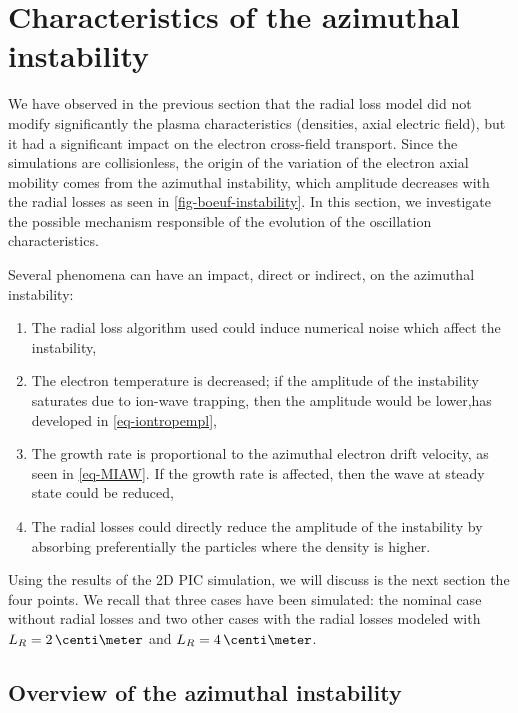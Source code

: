 
\FloatBarrier
\section{Characteristics of the azimuthal instability}
\label{sec-Ztheta-instability}

We have observed in the previous section that the radial loss model did not modify significantly the plasma characteristics (densities, axial electric field), but it had a significant impact on the electron cross-field transport.
Since the simulations are collisionless, the origin of the variation of the electron axial mobility comes from the azimuthal instability, which amplitude decreases with the radial losses as seen in \cref{fig-boeuf-instability}.
In this section, we investigate the possible mechanism responsible of the evolution of the oscillation characteristics.

Several phenomena can have an impact, direct or indirect, on the azimuthal instability\string:
\begin{enumerate}
  \item The radial loss algorithm used could induce numerical noise which affect the instability,
  \item The electron temperature is decreased\string; if the amplitude of the instability saturates due to ion-wave trapping, then the amplitude would be lower,has developed in \cref{eq-iontropempl},
  \item The growth rate is proportional to the azimuthal electron drift velocity, as seen in \cref{eq-MIAW}. If the growth rate is affected, then the wave at steady state could be reduced,
  \item The radial losses  could directly reduce the amplitude of the instability by absorbing preferentially the particles where the density is higher.
\end{enumerate}

Using the results of the \ac{2D} \ac{PIC} simulation, we will discuss is the next section the four points.
We recall that three cases have been simulated\string: the nominal case without radial losses and two other cases with the radial losses modeled with $L_R=2\,\centi\meter$ and $L_R=4\,\centi\meter$.



\subsection{Overview of the azimuthal instability} \label{subsec-azi_insta_Ztheta}

